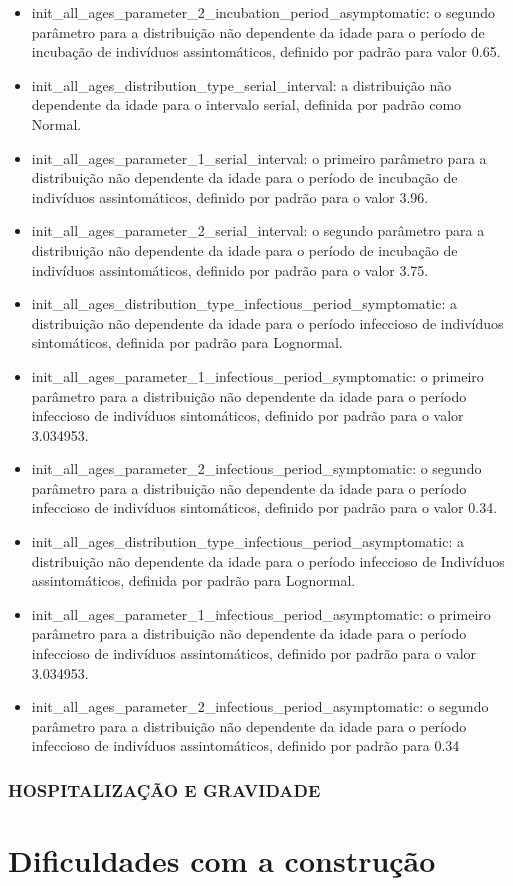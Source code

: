 \begin{itemize}
\item {init\_all\_ages\_parameter\_2\_incubation\_period\_asymptomatic}: o segundo parâmetro para a distribuição não dependente da idade para o período de incubação de indivíduos assintomáticos, definido por padrão para valor 0.65.
\item {init\_all\_ages\_distribution\_type\_serial\_interval}: a distribuição não dependente da idade para o intervalo serial, definida por padrão como Normal.
\item {init\_all\_ages\_parameter\_1\_serial\_interval}: o primeiro parâmetro para a distribuição não dependente da idade para o período de incubação de indivíduos assintomáticos, definido por padrão para o valor 3.96.
\item {init\_all\_ages\_parameter\_2\_serial\_interval}: o segundo parâmetro para a distribuição não dependente da idade para o período de incubação de indivíduos assintomáticos, definido por padrão para o valor 3.75.
\item {init\_all\_ages\_distribution\_type\_infectious\_period\_symptomatic}: a distribuição não dependente da idade para o período infeccioso de indivíduos sintomáticos, definida por padrão para Lognormal.
\item {init\_all\_ages\_parameter\_1\_infectious\_period\_symptomatic}: o primeiro parâmetro para a distribuição não dependente da idade para o período infeccioso de indivíduos sintomáticos, definido por padrão para o valor 3.034953.
\item {init\_all\_ages\_parameter\_2\_infectious\_period\_symptomatic}: o segundo parâmetro para a distribuição não dependente da idade para o período infeccioso de indivíduos sintomáticos, definido por padrão para o valor 0.34.
\item {init\_all\_ages\_distribution\_type\_infectious\_period\_asymptomatic}: a distribuição não dependente da idade para o período infeccioso de Indivíduos assintomáticos, definida por padrão para Lognormal.
\item {init\_all\_ages\_parameter\_1\_infectious\_period\_asymptomatic}: o primeiro parâmetro para a distribuição não dependente da idade para o período infeccioso de indivíduos assintomáticos, definido por padrão para o valor 3.034953.
\item {init\_all\_ages\_parameter\_2\_infectious\_period\_asymptomatic}: o segundo parâmetro para a distribuição não dependente da idade para o período infeccioso de indivíduos assintomáticos, definido por padrão para 0.34
\end{itemize}

\subsubsection{HOSPITALIZAÇÃO E GRAVIDADE}









\section{Dificuldades com a construção}

